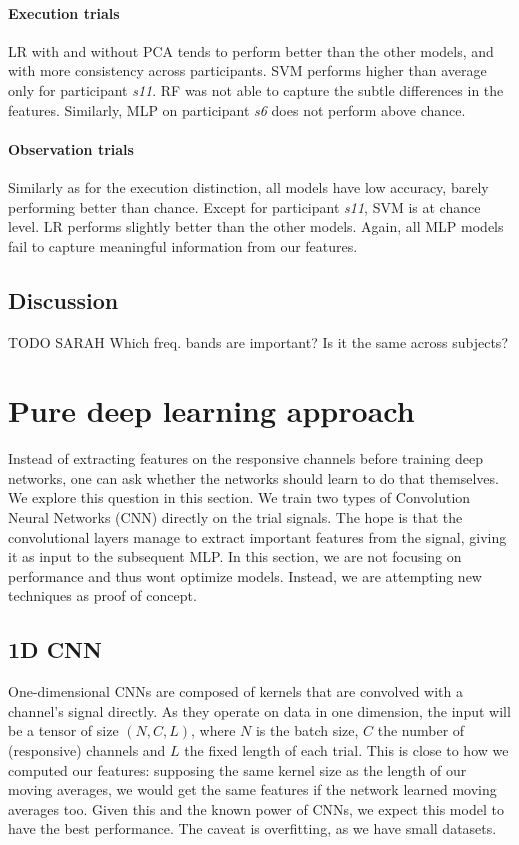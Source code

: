 \documentclass[10pt,conference,compsocconf]{IEEEtran}
\begin{document}
\paragraph{Execution trials}
LR with and without PCA tends to perform better than the other models, and with more consistency across participants. SVM performs higher than average only for participant \textit{s11}. RF was not able to capture the subtle differences in the features. Similarly, MLP on participant \textit{s6} does not perform above chance.

\paragraph{Observation trials}
Similarly as for the execution distinction, all models have low accuracy, barely performing better than chance. Except for participant \textit{s11}, SVM is at chance level. LR performs slightly better than the other models. Again, all MLP models fail to capture meaningful information from our features.

\subsection{Discussion}
TODO SARAH
Which freq. bands are important? Is it the same across subjects?

\section{Pure deep learning approach}
\label{sec:deeplearning}
Instead of extracting features on the responsive channels before training deep networks, one can ask whether the networks should learn to do that themselves. We explore this question in this section. We train two types of Convolution Neural Networks (CNN) directly on the trial signals. The hope is that the convolutional layers manage to extract important features from the signal, giving it as input to the subsequent MLP. In this section, we are not focusing on performance and thus wont optimize models. Instead, we are attempting new techniques as proof of concept.

\subsection{1D CNN}
One-dimensional CNNs are composed of kernels that are convolved with a channel's signal directly. As they operate on data in one dimension, the input will be a tensor of size \((N, C, L)\), where \(N\) is the batch size, \(C\) the number of (responsive) channels and \(L\) the fixed length of each trial. This is close to how we computed our features: supposing the same kernel size as the length of our moving averages, we would get the same features if the network learned moving averages too. Given this and the known power of CNNs, we expect this model to have the best performance. The caveat is overfitting, as we have small datasets.
\end{document}
